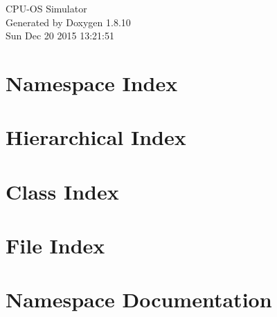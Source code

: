\documentclass[twoside]{book}
\newcommand{\+}{\discretionary{\mbox{\scriptsize$\hookleftarrow$}}{}{}}
\newcommand{\clearemptydoublepage}{%
  \newpage{\pagestyle{empty}\cleardoublepage}%
}
\begin{document}
\hypersetup{pageanchor=false,
             bookmarks=true,
             bookmarksnumbered=true,
             pdfencoding=unicode
            }
\begin{titlepage}
\vspace*{7cm}
\begin{center}%
{\Large C\+P\+U-\/\+O\+S Simulator }\\
\vspace*{1cm}
{\large Generated by Doxygen 1.8.10}\\
\vspace*{0.5cm}
{\small Sun Dec 20 2015 13:21:51}\\
\end{center}
\end{titlepage}
\clearemptydoublepage
\tableofcontents
\clearemptydoublepage
{}
\hypersetup{pageanchor=true}

\chapter{Namespace Index}

\chapter{Hierarchical Index}

\chapter{Class Index}

\chapter{File Index}

\chapter{Namespace Documentation}


















\end{document}
